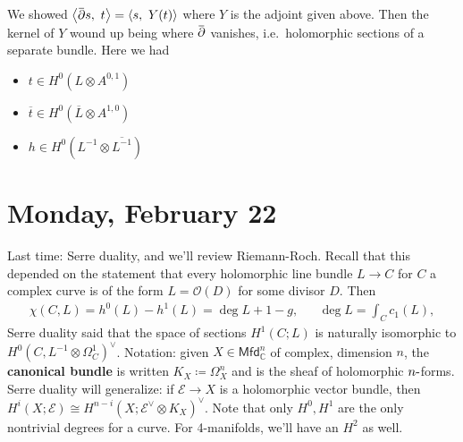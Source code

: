 \begin{remark}

We showed
\({\left\langle {\mkern 1.5mu\overline{\mkern-1.5mu{\partial}\mkern-1.5mu}\mkern 1.5mus},~{t} \right\rangle} = {\left\langle {s},~{Y (t)} \right\rangle}\)
where \(Y\) is the adjoint given above. Then the kernel of \(Y\) wound
up being where
\(\mkern 1.5mu\overline{\mkern-1.5mu{\partial}\mkern-1.5mu}\mkern 1.5mu\)
vanishes, i.e.~holomorphic sections of a separate bundle. Here we had

\begin{itemize}
\tightlist
\item
  \(t \in H^0(L\otimes A^{0, 1})\)
\item
  \({\overline{{t}}} \in H^0({\overline{{L}}}\otimes A^{1,0})\)
\item
  \(h\in H^0( L ^{-1} \otimes{\overline{{ L ^{-1} }}})\)
\end{itemize}

\end{remark}

\hypertarget{monday-february-22}{%
\section{Monday, February 22}\label{monday-february-22}}

\begin{remark}

Last time: Serre duality, and we'll review Riemann-Roch. Recall that
this depended on the statement that every holomorphic line bundle
\(L\to C\) for \(C\) a complex curve is of the form
\(L = {\mathcal{O}}(D)\) for some divisor \(D\). Then
\begin{align*}
\chi(C, L) = h^0(L) - h^1(L) = \deg L + 1 - g, && \deg L = \int_C c_1(L)
,\end{align*}
Serre duality said that the space of sections \(H^1(C; L)\) is naturally
isomorphic to \(H^0(C, L ^{-1} \otimes\Omega_C^1)^\vee\). Notation:
given \(X \in {\mathsf{Mfd}}_{\mathbb{C}}^n\) of complex, dimension
\(n\), the \textbf{canonical bundle} is written
\(K_X \coloneqq\Omega_X^n\) and is the sheaf of holomorphic
\(n{\hbox{-}}\)forms. Serre duality will generalize: if
\(\mathcal{E}\to X\) is a holomorphic vector bundle, then
\(H^i(X; \mathcal{E}) \cong H^{n-i}(X; \mathcal{E}^\vee\otimes K_X)^\vee\).
Note that only \(H^0, H^1\) are the only nontrivial degrees for a curve.
For 4-manifolds, we'll have an \(H^2\) as well.

\end{remark}


